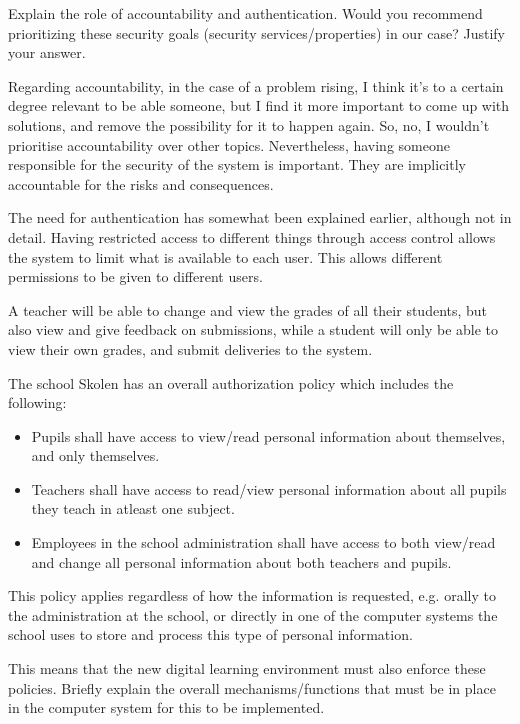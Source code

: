 \documentclass{myassignment}
\begin{document}
	\begin{problem}
		Explain the role of accountability and authentication. Would you recommend prioritizing these security goals (security services/properties) in our case? Justify your answer.%
	\end{problem}

	\begin{answer}
		Regarding accountability, in the case of a problem rising, I think it's to a certain degree relevant to be able someone, but I find it more important to come up with solutions, and remove the possibility for it to happen again. So, no, I wouldn't prioritise accountability over other topics. Nevertheless, having someone responsible for the security of the system is important. They are implicitly accountable for the risks and consequences.

		The need for authentication has somewhat been explained earlier, although not in detail. Having restricted access to different things through access control allows the system to limit what is available to each user. This allows different permissions to be given to different users. 
 
		A teacher will be able to change and view the grades of all their students, but also view and give feedback on submissions, while a student will only be able to view their own grades, and submit deliveries to the system.
	\end{answer}

	\pagebreak
	\begin{problem}
		The school Skolen has an overall authorization policy which includes the following:%
		\begin{itemize}[label=---,leftmargin=5em]
			\setlength\itemsep{0em}
			\item Pupils shall have access to view/read personal information about themselves, and only themselves.%
			\item Teachers shall have access to read/view personal information about all pupils they teach in atleast one subject.%
			\item Employees in the school administration shall have access to both view/read and change all personal information about both teachers and pupils.%
		\end{itemize}

		This policy applies regardless of how the information is requested, e.g. orally to the administration at the school, or directly in one of the computer systems the school uses to store and process this type of personal information.
		
		This means that the new digital learning environment must also enforce these policies. Briefly explain the overall mechanisms/functions that must be in place in the computer system for this to be implemented.%
	\end{problem}
\end{document}
